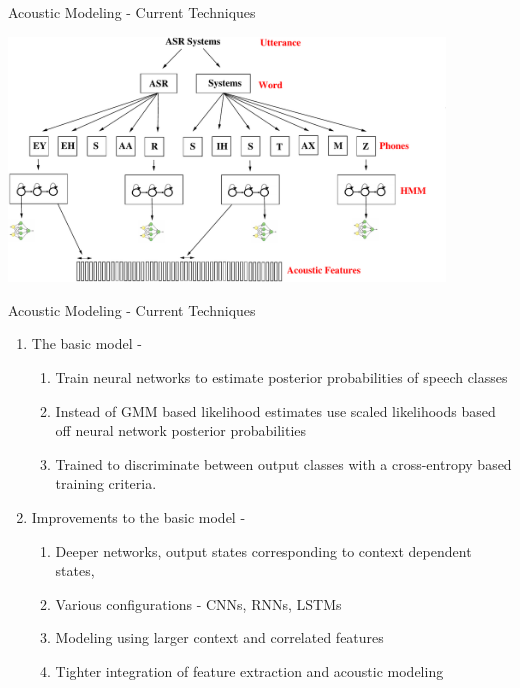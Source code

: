\begin{frame}{Acoustic Modeling - Current Techniques}
\begin{center}
\includegraphics[height=65mm]{figures/am-mlp}
\end{center}
\end{frame}

\begin{frame}{Acoustic Modeling - Current Techniques}
\begin{enumerate}
\item The \alert{basic} model \cite{morgan1995continuous}-
\begin{enumerate}
\item Train neural networks to estimate posterior probabilities of speech classes
\item Instead of GMM based likelihood estimates use scaled likelihoods based
off neural network posterior probabilities
\item Trained to discriminate between output classes with a cross-entropy
based training criteria.
\end{enumerate}
\item \alert{Improvements to the basic model} \cite{hinton2012deep}-
\begin{enumerate}
\item Deeper networks, output states corresponding to context dependent states, 
\item Various configurations - CNNs, RNNs, LSTMs
\item Modeling using larger context and correlated features
\item Tighter integration of feature extraction and acoustic modeling
\end{enumerate}
\end{enumerate}
\end{frame}

